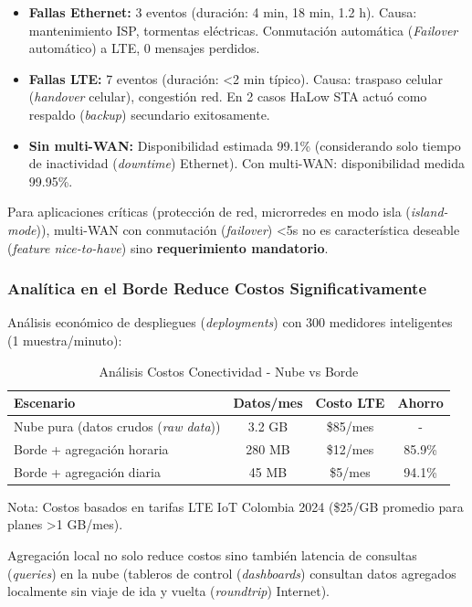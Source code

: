 \begin{itemize}
\item \textbf{Fallas Ethernet:} 3 eventos (duración: 4 min, 18 min, 1.2 h). Causa: mantenimiento ISP, tormentas eléctricas. Conmutación automática (\textit{Failover} automático) a LTE, 0 mensajes perdidos.
\item \textbf{Fallas LTE:} 7 eventos (duración: <2 min típico). Causa: traspaso celular (\textit{handover} celular), congestión red. En 2 casos HaLow STA actuó como respaldo (\textit{backup}) secundario exitosamente.
\item \textbf{Sin multi-WAN:} Disponibilidad estimada 99.1\% (considerando solo tiempo de inactividad (\textit{downtime}) Ethernet). Con multi-WAN: disponibilidad medida 99.95\%.
\end{itemize}

Para aplicaciones críticas (protección de red, microrredes en modo isla (\textit{island-mode})), multi-WAN con conmutación (\textit{failover}) <5s no es característica deseable (\textit{feature nice-to-have}) sino \textbf{requerimiento mandatorio}.

\subsubsection{Analítica en el Borde Reduce Costos Significativamente}

Análisis económico de despliegues (\textit{deployments}) con 300 medidores inteligentes (1 muestra/minuto):

\begin{table}[h]
\centering
\caption{Análisis Costos Conectividad - Nube vs Borde}
\begin{tabular}{|l|c|c|c|}
\hline
\textbf{Escenario} & \textbf{Datos/mes} & \textbf{Costo LTE} & \textbf{Ahorro} \\
\hline
Nube pura (datos crudos (\textit{raw data})) & 3.2 GB & \$85/mes & - \\
Borde + agregación horaria & 280 MB & \$12/mes & 85.9\% \\
Borde + agregación diaria & 45 MB & \$5/mes & 94.1\% \\
\hline
\end{tabular}
\end{table}

Nota: Costos basados en tarifas LTE IoT Colombia 2024 (\$25/GB promedio para planes >1 GB/mes).

Agregación local no solo reduce costos sino también latencia de consultas (\textit{queries}) en la nube (tableros de control (\textit{dashboards}) consultan datos agregados localmente sin viaje de ida y vuelta (\textit{roundtrip}) Internet).

